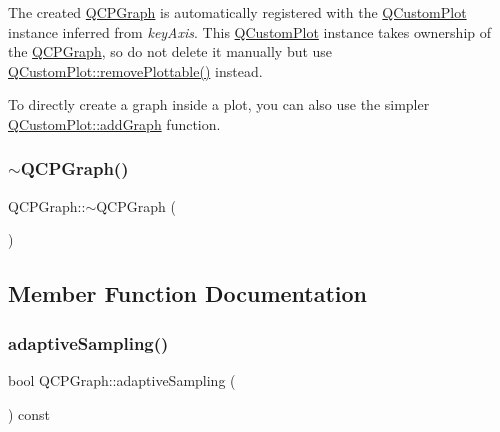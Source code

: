 The created \mbox{\hyperlink{class_q_c_p_graph}{Q\+C\+P\+Graph}} is automatically registered with the \mbox{\hyperlink{class_q_custom_plot}{Q\+Custom\+Plot}} instance inferred from {\itshape key\+Axis}. This \mbox{\hyperlink{class_q_custom_plot}{Q\+Custom\+Plot}} instance takes ownership of the \mbox{\hyperlink{class_q_c_p_graph}{Q\+C\+P\+Graph}}, so do not delete it manually but use \mbox{\hyperlink{class_q_custom_plot_af3dafd56884208474f311d6226513ab2}{Q\+Custom\+Plot\+::remove\+Plottable()}} instead.

To directly create a graph inside a plot, you can also use the simpler \mbox{\hyperlink{class_q_custom_plot_a6fb2873d35a8a8089842d81a70a54167}{Q\+Custom\+Plot\+::add\+Graph}} function. \mbox{\label{class_q_c_p_graph_ae9998cfb9d379ac0ef3fbd6995cfbd76}} 
\subsubsection{\texorpdfstring{$\sim$QCPGraph()}{~QCPGraph()}}
{\footnotesize\ttfamily Q\+C\+P\+Graph\+::$\sim$\+Q\+C\+P\+Graph (\begin{DoxyParamCaption}{ }\end{DoxyParamCaption})\hspace{0.3cm}{\ttfamily [virtual]}}



\subsection{Member Function Documentation}
\mbox{\label{class_q_c_p_graph_a1ba934b9621270b9a40fcdd2d9ba2adb}} 
\subsubsection{\texorpdfstring{adaptiveSampling()}{adaptiveSampling()}}
{\footnotesize\ttfamily bool Q\+C\+P\+Graph\+::adaptive\+Sampling (\begin{DoxyParamCaption}{ }\end{DoxyParamCaption}) const\hspace{0.3cm}{\ttfamily [inline]}}

\mbox{\label{class_q_c_p_graph_ae0555c0d3fe0fa7cb8628f88158d420f}} 
